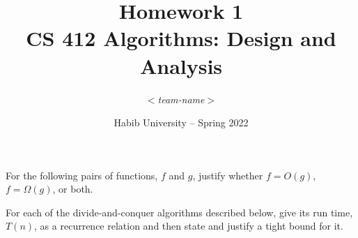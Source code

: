 \documentclass[addpoints]{exam}
\title{Homework 1\\ CS 412 Algorithms: Design and Analysis}
\author{$<$\textit{team-name}$>$}  %
\date{Habib University -- Spring 2022}
\begin{document}
\maketitle

\begin{questions}

\question[5]
  For the following pairs of functions, $f$ and $g$, justify whether $f = O(g)$, $f = \Omega(g)$, or both.

  \begin{solution}
    \begin{parts}
    \part 
    \part 
    \part 
    \part 
    \end{parts}
  \end{solution}

\question For each of the divide-and-conquer algorithms described below, give its run time, $T(n)$, as a recurrence relation and then state and justify a tight bound for it.
\end{questions}
\end{document}
